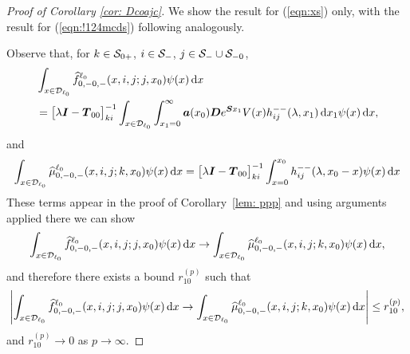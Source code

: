 \begin{proof}[Proof of Corollary \ref{cor: Dcoajc}]
	We show the result for (\ref{eqn:xs}) only, with the result for (\ref{eqn:!124mcds}) following analogously. 
	
	Observe that, for \(k\in\mathcal{S}_{0+}\), \(i\in\mathcal{S}_-\), \(j\in\mathcal{S}_-\cup\mathcal{S}_{-0}\), 
	\begin{align}
		&\int_{x\in\mathcal{D}_{\ell_0}} \widehat f_{0,-0,-}^{\ell_0}(x,i,j;j,x_0)\psi(x)\, \mathrm{d} x \nonumber 
		\\&{}= \begin{bmatrix} \lambda \boldsymbol I - \boldsymbol T_{00} \end{bmatrix}^{-1}_{ki}\int_{x\in\mathcal{D}_{\ell_0}}\int_{x_1=0}^\infty \boldsymbol a(x_0) \boldsymbol D e^{\boldsymbol S x_1} V(x)h_{ij}^{--}(\lambda,x_1)\, \mathrm{d} x_1\psi(x)\, \mathrm{d} x,
	\end{align}
	and 
	\begin{align}
		\int_{x\in\mathcal{D}_{\ell_0}} \widehat \mu_{0,-0,-}^{\ell_0}(x,i,j;k,x_0)\psi(x)\, \mathrm{d} x \nonumber  = \begin{bmatrix} \lambda \boldsymbol I - \boldsymbol T_{00} \end{bmatrix}^{-1}_{ki}\int_{x=0}^{x_0} h_{ij}^{--}(\lambda,x_0-x)\psi(x)\, \mathrm{d} x 
	\end{align}
	These terms appear in the proof of Corollary~\ref{lem: ppp} and using arguments applied there we can show
	\begin{align}
		\int_{x\in\mathcal{D}_{\ell_0}} \widehat f_{0,-0,-}^{\ell_0}(x,i,j;j,x_0)\psi(x)\, \mathrm{d} x  \to \int_{x\in\mathcal{D}_{\ell_0}} \widehat \mu_{0,-0,-}^{\ell_0}(x,i,j;k,x_0)\psi(x)\, \mathrm{d} x ,\label{eqn:xssgwg}
	\end{align}
	and therefore there exists a bound \(r_{10}^{(p)}\) such that 
	\[\left|\int_{x\in\mathcal{D}_{\ell_0}} \widehat f_{0,-0,-}^{\ell_0}(x,i,j;j,x_0)\psi(x)\, \mathrm{d} x  \to \int_{x\in\mathcal{D}_{\ell_0}} \widehat \mu_{0,-0,-}^{\ell_0}(x,i,j;k,x_0)\psi(x)\, \mathrm{d} x\right|\leq r_{10}^{(p)} ,\]
	and \(r_{10}^{(p)}\to 0\) as \(p\to\infty\). 
\end{proof}

